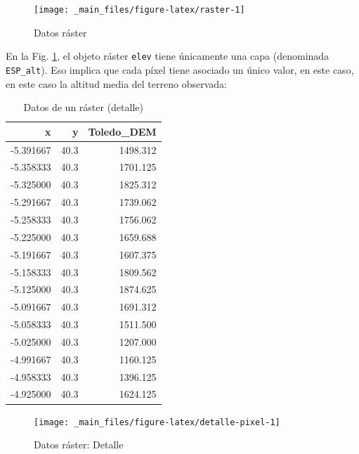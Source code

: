 \documentclass[
]{report}
\begin{document}
\begin{figure}

{\centering \texttt{[image: \_main\_files/figure-latex/raster-1]} 

}

\caption{Datos ráster}\label{fig:raster}
\end{figure}

En la Fig. \ref{fig:raster}, el objeto ráster \texttt{elev} tiene únicamente una capa
(denominada \texttt{ESP\_alt}). Eso implica que cada píxel tiene asociado un único
valor, en este caso, en este caso la altitud media del terreno observada:

\begin{table}

\caption{\label{tab:detalle-pixel}Datos de un ráster (detalle)}
\centering
\begin{tabular}[t]{r|r|r}
\hline
x & y & Toledo\_DEM\\
\hline
-5.391667 & 40.3 & 1498.312\\
\hline
-5.358333 & 40.3 & 1701.125\\
\hline
-5.325000 & 40.3 & 1825.312\\
\hline
-5.291667 & 40.3 & 1739.062\\
\hline
-5.258333 & 40.3 & 1756.062\\
\hline
-5.225000 & 40.3 & 1659.688\\
\hline
-5.191667 & 40.3 & 1607.375\\
\hline
-5.158333 & 40.3 & 1809.562\\
\hline
-5.125000 & 40.3 & 1874.625\\
\hline
-5.091667 & 40.3 & 1691.312\\
\hline
-5.058333 & 40.3 & 1511.500\\
\hline
-5.025000 & 40.3 & 1207.000\\
\hline
-4.991667 & 40.3 & 1160.125\\
\hline
-4.958333 & 40.3 & 1396.125\\
\hline
-4.925000 & 40.3 & 1624.125\\
\hline
\end{tabular}
\end{table}

\begin{figure}

{\centering \texttt{[image: \_main\_files/figure-latex/detalle-pixel-1]} 

}

\caption{Datos ráster: Detalle}\label{fig:detalle-pixel}
\end{figure}
\end{document}
